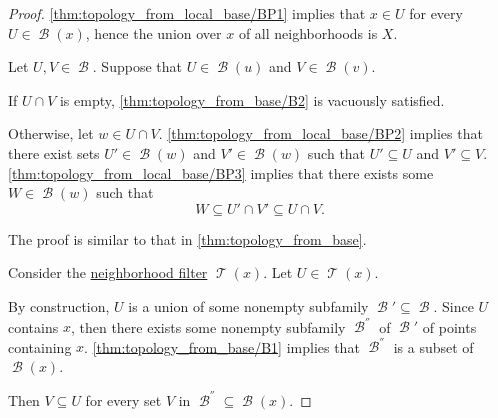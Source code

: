 \begin{proof}

   \ref{thm:topology_from_local_base/BP1} implies that \( x \in U \) for every \( U \in \mscrB(x) \), hence the union over \( x \) of all neighborhoods is \( X \).

   Let \( U, V \in \mscrB \). Suppose that \( U \in \mscrB(u) \) and \( V \in \mscrB(v) \).

  If \( U \cap V \) is empty, \ref{thm:topology_from_base/B2} is vacuously satisfied.

  Otherwise, let \( w \in U \cap V \). \ref{thm:topology_from_local_base/BP2} implies that there exist sets \( U' \in \mscrB(w) \) and \( V' \in \mscrB(w) \) such that \( U' \subseteq U \) and \( V' \subseteq V \). \ref{thm:topology_from_local_base/BP3} implies that there exists some \( W \in \mscrB(w) \) such that
  \begin{equation*}
    W \subseteq U' \cap V' \subseteq U \cap V.
  \end{equation*}

   The proof is similar to that in \cref{thm:topology_from_base}.

   Consider the \hyperref[def:topological_neighborhood]{neighborhood filter} \( \mscrT(x) \). Let \( U \in \mscrT(x) \).

  By construction, \( U \) is a union of some nonempty subfamily \( \mscrB' \subseteq \mscrB \). Since \( U \) contains \( x \), then there exists some nonempty subfamily \( \mscrB^\dprime \) of \( \mscrB' \) of points containing \( x \). \ref{thm:topology_from_base/B1} implies that \( \mscrB^\dprime \) is a subset of \( \mscrB(x) \).

  Then \( V \subseteq U \) for every set \( V \) in \( \mscrB^\dprime \subseteq \mscrB(x) \).
\end{proof}

